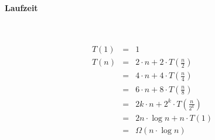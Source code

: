 \begin{enumerate}[(a)]
    \paragraph{Laufzeit} \ 

    \begin{eqnarray}
    T(1) &=& 1\\
    T(n) &=& 2\cdot n + 2 \cdot T(\frac{n}{2})\\
         &=& 4\cdot n + 4 \cdot T(\frac{n}{4})\\
         &=& 6\cdot n + 8 \cdot T(\frac{n}{8})\\
         &=& 2k\cdot n + 2^k \cdot T(\frac{n}{2^k})\\
         &=& 2 n \cdot \log n + n \cdot T(1)\\
         &=& \Omega(n \cdot \log n)
    \end{eqnarray}

\end{enumerate}


